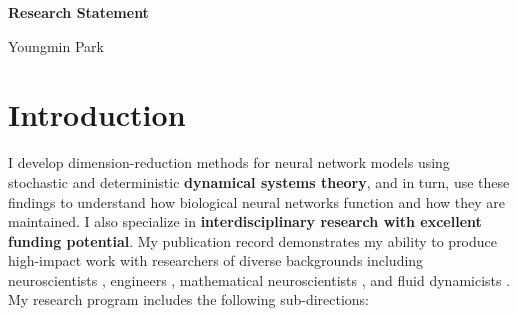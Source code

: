\documentclass[a4paper,11pt]{article}
\begin{document}
\begin{center}
\Large \textbf{Research Statement}

\Large Youngmin Park
\end{center}

\section{Introduction}

I develop dimension-reduction methods for neural network models using stochastic and deterministic \textbf{dynamical systems theory}, and in turn, use these findings to understand how biological neural networks function and how they are maintained. I also specialize in \textbf{interdisciplinary research with excellent funding potential}. My publication record demonstrates my ability to produce high-impact work with researchers of diverse backgrounds including neuroscientists \cite{park2020circuit}, engineers \cite{ermentrout2019recent,park2020high}, mathematical neuroscientists \cite{park2016weakly,park2018infinitesimal,park2018multiple,park2018scalar}, and fluid dynamicists \cite{park2020dynamics}. My research program includes the following sub-directions:
\end{document}
